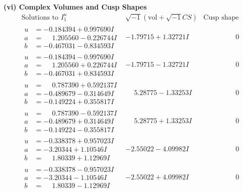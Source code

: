 \documentclass[1p]{elsarticle_modified}
\theoremstyle{definition}
\newcommand{\I}{\sqrt{-1}}
\begin{document}
\newpage\flushleft \textbf{(vi) Complex Volumes and Cusp Shapes}
$$\begin{array}{c|c|c}  
\text{Solutions to }I^u_{1}& \I (\text{vol} + \sqrt{-1}CS) & \text{Cusp shape}\\
 \hline 
\begin{aligned}
u &= -0.184394 + 0.997690 I \\
a &= \phantom{-}1.205560 - 0.226744 I \\
b &= -0.467031 - 0.834593 I\end{aligned}
 & -1.79715 + 1.32721 I & \phantom{-0.000000 } 0 \\ \hline\begin{aligned}
u &= -0.184394 - 0.997690 I \\
a &= \phantom{-}1.205560 + 0.226744 I \\
b &= -0.467031 + 0.834593 I\end{aligned}
 & -1.79715 - 1.32721 I & \phantom{-0.000000 } 0 \\ \hline\begin{aligned}
u &= \phantom{-}0.787390 + 0.592137 I \\
a &= -0.489679 - 0.314649 I \\
b &= -0.149224 + 0.355817 I\end{aligned}
 & \phantom{-}5.28775 - 1.33253 I & \phantom{-0.000000 } 0 \\ \hline\begin{aligned}
u &= \phantom{-}0.787390 - 0.592137 I \\
a &= -0.489679 + 0.314649 I \\
b &= -0.149224 - 0.355817 I\end{aligned}
 & \phantom{-}5.28775 + 1.33253 I & \phantom{-0.000000 } 0 \\ \hline\begin{aligned}
u &= -0.338378 + 0.957023 I \\
a &= -3.20344 + 1.10546 I \\
b &= \phantom{-}1.80339 + 1.12969 I\end{aligned}
 & -2.55022 - 4.09982 I & \phantom{-0.000000 } 0 \\ \hline\begin{aligned}
u &= -0.338378 - 0.957023 I \\
a &= -3.20344 - 1.10546 I \\
b &= \phantom{-}1.80339 - 1.12969 I\end{aligned}
 & -2.55022 + 4.09982 I & \phantom{-0.000000 } 0 \\ \hline\begin{aligned}

\end{aligned}
\end{array}$$
\end{document}
